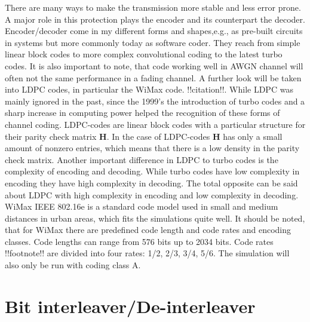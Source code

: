 There are many ways to make the transmission more stable and less error prone. A major role in this protection plays the encoder and its counterpart the decoder. Encoder/decoder come in my different forms and shapes,e.g., as pre-built circuits in systems but more commonly today as software coder. They reach from simple linear block codes to more complex convolutional coding to the latest turbo codes. It is also important to note, that code working well in \gls{AWGN} channel will often not the same performance in a fading channel.
\newline
A further look will be taken into \gls{LDPC} codes, in particular the WiMax code. !!citation!!. While \gls{LDPC} was mainly ignored in the past, since the 1999's the introduction of turbo codes and a sharp increase in computing power helped the recognition of these forms of channel coding.
\newline
\gls{LDPC}-codes are linear block codes with a particular structure for their parity check matrix \textbf{H}. In the case of \gls{LDPC}-codes \textbf{H} has only a small amount of nonzero entries, which means that there is a low density in the parity check matrix.
Another important difference in LDPC to turbo codes is the complexity of encoding and decoding. While turbo codes have low complexity in encoding they have high complexity in decoding. The total opposite can be said about \gls{LDPC} with high complexity in encoding and low complexity in decoding.  
\newline
WiMax IEEE 802.16e is a standard code model used in small and medium distances in urban areas, which fits the simulations quite well. It should be noted, that for WiMax there are predefined code length and code rates and encoding classes. Code lengths can range from 576 bits up to 2034 bits. Code rates !!footnote!! are divided into four rates: 1/2, 2/3, 3/4, 5/6. The simulation will also only be run with coding class A.  
\newpage

\section{Bit interleaver/De-interleaver}
\label{sec:interleaver}

